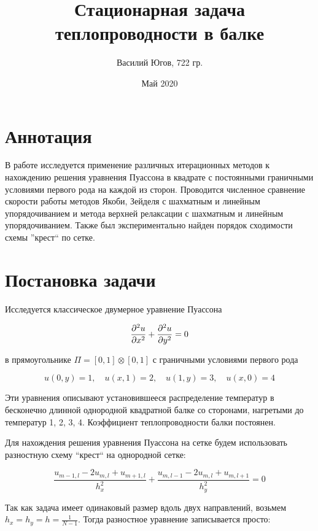 \documentclass[report , a4paper, onecolumn, 12pt]{article}
\title{Стационарная задача теплопроводности в балке}
\author{Василий Югов, 722 гр.}
\date{Май 2020}
\begin{document}
\maketitle

\tableofcontents

\section{Аннотация}

В работе исследуется применение различных итерационных методов к нахождению решения уравнения Пуассона в квадрате с постоянными граничными условиями первого рода на каждой из сторон. Проводится численное сравнение скорости работы методов Якоби, Зейделя с шахматным и линейным упорядочиванием и метода верхней релаксации с шахматным и линейным упорядочиванием. Также был экспериментально найден порядок сходимости схемы ''крест`` по сетке.

\section{Постановка задачи}

Исследуется классическое двумерное уравнение Пуассона

\begin{equation}
 \pdv[2]{u}{x}(x,y)+\pdv[2]{u}{y}(x,y)=0
\end{equation}

 в прямоугольнике $\Pi = [0, 1] \otimes [0, 1]$ с граничными условиями первого рода

\begin{equation}
 \label{boundary}u(0, y) = 1, \quad u(x, 1) = 2, \quad u(1, y) = 3, \quad u(x, 0) = 4
\end{equation}

Эти уравнения описывают установившееся распределение температур в бесконечно длинной однородной квадратной балке со сторонами, нагретыми до температур 1, 2, 3, 4. Коэффициент теплопроводности балки постоянен. 

Для нахождения решения уравнения Пуассона на сетке будем использовать разностную схему ``крест`` на однородной сетке:

\begin{equation}
 \frac{u_{m - 1, l} - 2 u_{m, l} + u_{m + 1, l}}{h_x^2} + \frac{u_{m,l-1} - 2 u_{m, l} + u_{m, l+1}}{h_y^2} = 0
\end{equation}


Так как задача имеет одинаковый размер вдоль двух направлений, возьмем $h_x = h_y = h = \frac{1}{N - 1}$. Тогда разностное уравнение записывается просто:
\end{document}
